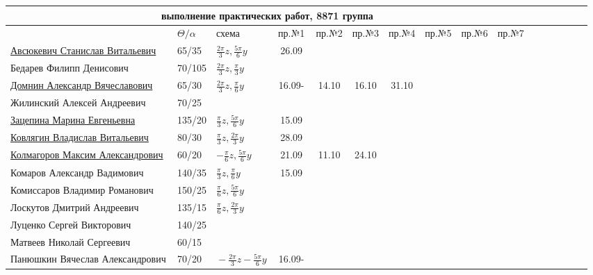 \documentclass[a4paper,11pt]{article}
\begin{document}
\newpage
%
\hspace{-2.1cm}
\begin{tabular}{l|llccccccccccccc}
\multicolumn{10}{c}{выполнение практических работ, 8871 группа} \\
\toprule
                        &$\Theta/\alpha$&схема&\,пр.№1\,&пр.№2&пр.№3&пр.№4&пр.№5&пр.№6&пр.№7\\
\midrule
\href{}{Авсюкевич Станислав Витальевич}	        &65/35 &$\frac{2\pi}{3}z,\frac{5\pi}{6}y$&\,26.09\,&&\\
Бедарев Филипп Денисович        &70/105&$\frac{2\pi}{3}z,\frac{\pi}{3}y$&       &&\\
\href{}{Домнин Александр Вячеславович}                  &65/30 &$\frac{2\pi}{3}z,\frac{\pi}{6}y$&\,16.09-\,&14.10&16.10&31.10\\ 
Жилинский Алексей Андреевич	&70/25 &&       &&\\
\href{}{Зацепина Марина Евгеньевна}	&135/20&$\frac{\pi}{3}z,\frac{5\pi}{6}y$&\,15.09\,&&\\	
\href{}{Ковлягин Владислав Витальевич}	                &80/30 &$\frac{\pi}{3}z,\frac{2\pi}{3}y$&\,28.09\,&&\\
\href{}{Колмагоров Максим Александрович}	        &60/20 &$-\frac{\pi}{6}z,\frac{5\pi}{6}y$&\,21.09\,&11.10&24.10\\
\midrule                                     
Комаров Александр Вадимович	&140/35&$\frac{\pi}{3}z,\frac{\pi}{6}y$&\,15.09\,&&\\
Комиссаров Владимир Романович	&150/25&$\frac{\pi}{6}z,\frac{5\pi}{6}y$&       &&\\
Лоскутов Дмитрий Андреевич	&135/15&$\frac{\pi}{6}z,\frac{2\pi}{3}y$&       &&\\	
Луценко Сергей Викторович	&140/25&&       &&\\	
Матвеев Николай Сергеевич	&60/15 &&       &&\\	
Панюшкин Вячеслав Александрович\,&70/20 &$\!-\!\frac{2\pi}{3}z\!-\!\frac{5\pi}{6}y\!$&\,16.09-\,&\\
\midrule                                  

\end{tabular}
\end{document}
